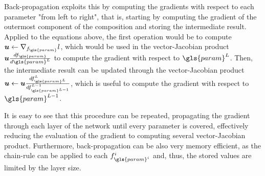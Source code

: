 Back-propagation exploits this by computing the gradients with respect to each parameter "from left to right", that is, starting by computing the gradient of the outermost component of the composition and storing the intermediate result.
Applied to the equations above, the first operation would be to compute $\bm{u}\gets\nabla_{f_{\gls{param}}} l$, which would be used in the vector-Jacobian product $\bm{u} \frac{d f_{\gls{param}}}{d \gls{param}^L}$ to compute the gradient with respect to $\gls{param}^{L}$.
Then, the intermediate result can be updated through the vector-Jacobian product $\bm{u}\gets \bm{u} \frac{d f^L_{\gls{param}^L}}{d f^{L-1}_{\gls{param}^{L-1}}}$, which is useful to compute the gradient with respect to $\gls{param}^{L-1}$.

It is easy to see that this procedure can be repeated, propagating the gradient through each layer of the network until every parameter is covered, effectively reducing the evaluation of the gradient to computing several vector-Jacobian product.
Furthermore, back-propagation can be also very memory efficient, as the chain-rule can be applied to each $f^i_{\gls{param}^i}$ and, thus, the stored values are limited by the layer size\footnotemark.

% 

